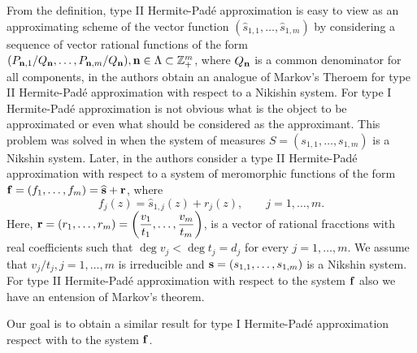 \documentclass[10pt,a4paper]{article}
\theoremstyle{definition}
\theoremstyle{remark}
\numberwithin{equation}{section}
\begin{document}
From the definition, type II Hermite-Pad\'e approximation is easy to view as an approximating scheme of the vector function
$(\widehat{s}_{1,1},\ldots,\widehat{s}_{1,m})$ by considering a sequence of vector rational functions of the form $(P_{{\bf n},1}/Q_{\bf n},\ldots,P_{{\bf n},m}/Q_{\bf n}), {\bf n} \in \Lambda \subset \mathbb{Z}_+^m$, where $Q_{\bf n}$ is a common denominator for all components, in \cite{BusLop} the authors obtain an analogue of Markov's Theroem for type II Hermite-Pad\'e approximation  with respect to a Nikishin system. For type I Hermite-Pad\'e approximation is not obvious   what is the object to be approximated or even what should be considered as the approximant. This problem was solved in \cite{LM} when the system of measures $S = (s_{1,1},\ldots,s_{1,m})$ is a Nikshin system. Later, in \cite{FLM} the authors consider a  type II Hermite-Pad\'e approximation with respect to a system of meromorphic functions  of the form  ${\bf f}=(f_{1},\ldots, f_{m}) = \widehat{\bf s} + {\bf r}$, where
\begin{equation}\label{fs}
f_{j}(z)=\widehat{s}_{1,j}(z)+ r_{j}(z), \qquad j=1,\ldots,m.
\end{equation}
Here,  ${\bf r}=(r_1,\ldots,r_m)=\left(\displaystyle \frac{v_{1}}{t_{1}},\ldots, \frac{v_{m}}{t_{m}}\right)$, is a vector of rational fracctions with real coefficients  such that $\deg v_{j}<\deg t_{j}=d_{j}$  for every $j=1,\ldots,m$. We assume that $v_j/t_j, j=1,\ldots,m$ is irreducible and ${\bf s}=(s_{1,1},\ldots,s_{1,m})$ is a Nikshin system. For  type II Hermite-Pad\'e approximation with respect to the system  ${\bf f}$ also we have an entension of Markov's theorem.\par
Our goal is to obtain a similar result for type I Hermite-Pad\'e approximation respect with to the system  ${\bf f}$.
\end{document}

